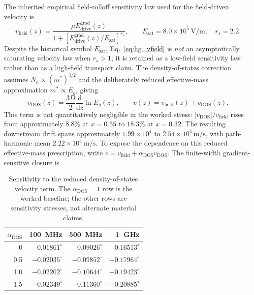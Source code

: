 \documentclass[11pt]{article}
\newcommand{\dd}{\mathrm{d}}
\begin{document}
The inherited empirical field-rolloff sensitivity law used for the field-driven velocity is
\begin{equation}
v_{\mathrm{field}}(z)=\frac{\mu E_{\mathrm{drive}}^{\mathrm{grad}}(z)}{1+[E_{\mathrm{drive}}^{\mathrm{grad}}(z)/E_{\mathrm{sat}}]^{r_s}},
\qquad E_{\mathrm{sat}}=8.0\times10^5~\mathrm{V/m},\quad r_s=2.2.
\label{eq:hg_vfield}
\end{equation}
Despite the historical symbol $E_{\mathrm{sat}}$, Eq.~\eqref{eq:hg_vfield} is \emph{not} an asymptotically saturating velocity law when $r_s>1$; it is retained as a low-field sensitivity law rather than as a high-field transport claim. The density-of-states correction assumes $N_c\propto(m^*)^{3/2}$ and the deliberately reduced effective-mass approximation $m^*\propto E_g$, giving
\begin{equation}
\boxed{v_{\mathrm{DOS}}(z)=\frac{3D}{2}\frac{\dd}{\dd z}\ln E_g(z),\qquad v(z)=v_{\mathrm{field}}(z)+v_{\mathrm{DOS}}(z).}
\label{eq:hg_velocity}
\end{equation}
This term is not quantitatively negligible in the worked stress: $|v_{\mathrm{DOS}}|/v_{\mathrm{field}}$ rises from approximately $8.8\%$ at $x=0.55$ to $18.3\%$ at $x=0.32$. The resulting downstream drift spans approximately $1.99\times10^4$ to $2.54\times10^4~\mathrm{m/s}$, with path-harmonic mean $2.22\times10^4~\mathrm{m/s}$. To expose the dependence on this reduced effective-mass prescription, write $v=v_{\mathrm{field}}+\alpha_{\mathrm{DOS}}v_{\mathrm{DOS}}$. The finite-width gradient-sensitive closure is
\begin{table}[H]
\centering
\caption{Sensitivity to the reduced density-of-states velocity term. The $\alpha_{\mathrm{DOS}}=1$ row is the worked baseline; the other rows are sensitivity stresses, not alternate material claims.}
\label{tab:hg_dos_sweep}
\begin{tabular}{rrrr}
\toprule
$\alpha_{\mathrm{DOS}}$ & \SI{100}{MHz} & \SI{500}{MHz} & \SI{1}{GHz} \\
\midrule
0   & $-0.01861^\circ$ & $-0.09026^\circ$ & $-0.16513^\circ$ \\
0.5 & $-0.02035^\circ$ & $-0.09852^\circ$ & $-0.17964^\circ$ \\
1.0 & $-0.02202^\circ$ & $-0.10644^\circ$ & $-0.19423^\circ$ \\
1.5 & $-0.02349^\circ$ & $-0.11360^\circ$ & $-0.20885^\circ$ \\
\bottomrule
\end{tabular}
\end{table}
\end{document}
